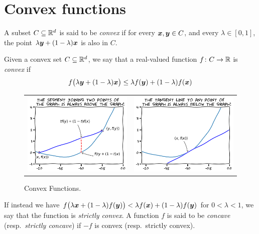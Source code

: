 \section{Convex functions}
\begin{definition}\label{def:convexSets}
A subset $C \subseteq \mathbb{R}^d$ is said to be \emph{convex} if for every $\boldsymbol{x}, \boldsymbol{y} \in C$, and every $\lambda \in [0,1]$, the point $\lambda \boldsymbol{y} + (1-\lambda) \boldsymbol{x}$ is also in $C$.
\end{definition}

\begin{definition}\label{def:ConvexFunctions}
Given a convex set $C \subseteq \mathbb{R}^d$, we say that a real-valued function $f \colon C \to \mathbb{R}$ is \emph{convex} if 
\begin{equation*}
f\big(\lambda \boldsymbol{y} + (1-\lambda)\boldsymbol{x} \big) \leq \lambda f(\boldsymbol{y}) + (1-\lambda) f(\boldsymbol{x})
\end{equation*}
\begin{figure}[ht!]
\begin{tabular}{cc}
\includegraphics[width=0.5\linewidth]{convexFunction1.png} &
\includegraphics[width=0.5\linewidth]{convexFunction2.png}
\end{tabular}
\caption{Convex Functions.}
\label{figure:convexFunction}
\end{figure}
If instead we have $f\big(\lambda \boldsymbol{x} + (1-\lambda)f(\boldsymbol{y})\big) < \lambda f(\boldsymbol{x}) + (1-\lambda) f(\boldsymbol{y})$ for $0<\lambda<1$, we say that the function is \emph{strictly convex}.  A function $f$ is said to be \emph{concave} (resp.~\emph{strictly concave}) if $-f$ is convex (resp.~strictly convex).
\end{definition}